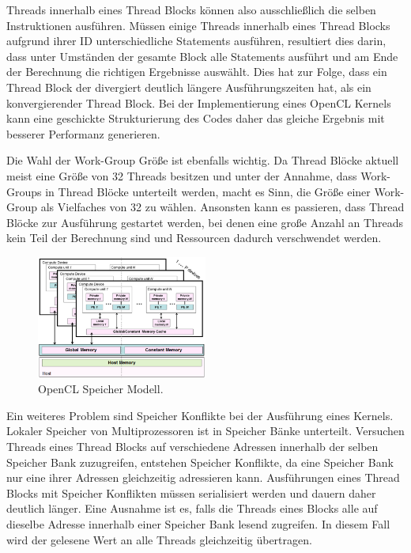 Threads innerhalb eines Thread Blocks können also ausschließlich die selben Instruktionen ausführen.
Müssen einige Threads innerhalb eines Thread Blocks aufgrund ihrer ID unterschiedliche Statements ausführen, resultiert dies darin, dass unter Umständen der gesamte Block alle Statements ausführt und am Ende der Berechnung die richtigen Ergebnisse auswählt.
Dies hat zur Folge, dass ein Thread Block der divergiert deutlich längere Ausführungszeiten hat, als ein konvergierender Thread Block.
Bei der Implementierung eines OpenCL Kernels kann eine geschickte Strukturierung des Codes daher das gleiche Ergebnis mit besserer Performanz generieren.

Die Wahl der Work-Group Größe ist ebenfalls wichtig.
Da Thread Blöcke aktuell meist eine Größe von 32 Threads besitzen und unter der Annahme, dass Work-Groups in Thread Blöcke unterteilt werden, macht es Sinn, die Größe einer Work-Group als Vielfaches von 32 zu wählen.
Ansonsten kann es passieren, dass Thread Blöcke zur Ausführung gestartet werden, bei denen eine große Anzahl an Threads kein Teil der Berechnung sind und Ressourcen dadurch verschwendet werden.

\begin{figure}
	\centering
	\includegraphics[width=0.5\textwidth]{../../Grafiken/OpenCL-Memory-Model.PNG}
	\caption{OpenCL Speicher Modell. \cite{OCLSPC}}
	\label{fig::ga06}
\end{figure} 
Ein weiteres Problem sind Speicher Konflikte bei der Ausführung eines Kernels.
Lokaler Speicher von Multiprozessoren ist in Speicher Bänke unterteilt.
Versuchen Threads eines Thread Blocks auf verschiedene Adressen innerhalb der selben Speicher Bank zuzugreifen, entstehen Speicher Konflikte, da eine Speicher Bank nur eine ihrer Adressen gleichzeitig adressieren kann.
Ausführungen eines Thread Blocks mit Speicher Konflikten müssen serialisiert werden und dauern daher deutlich länger.
Eine Ausnahme ist es, falls die Threads eines Blocks alle auf dieselbe Adresse innerhalb einer Speicher Bank lesend zugreifen.
In diesem Fall wird der gelesene Wert an alle Threads gleichzeitig übertragen.